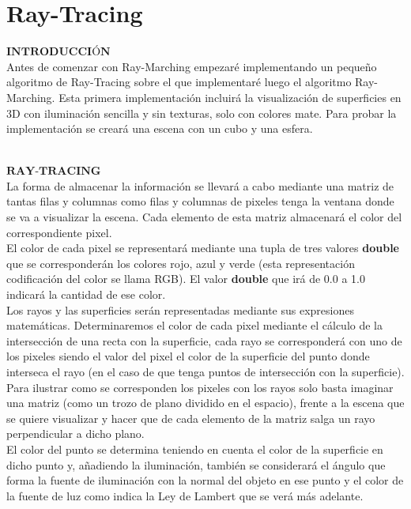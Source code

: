 \chapter*{Ray-Tracing}

$\textbf{INTRODUCCIÓN}$
${ }$\\

Antes de comenzar con Ray-Marching empezaré implementando un pequeño algoritmo de Ray-Tracing sobre el que implementaré luego el algoritmo Ray-Marching. Esta primera implementación incluirá la visualización de superficies en 3D con iluminación sencilla y sin texturas, solo con colores mate. Para probar la implementación se creará una escena con un cubo y una esfera.

${ }$\\
$\textbf{RAY-TRACING}$
${ }$\\

La forma de almacenar la información se llevará a cabo mediante una matriz de tantas filas y columnas como filas y columnas de pixeles tenga la ventana donde se va a visualizar la escena. Cada elemento de esta matriz almacenará el color del correspondiente pixel.
	${ }$\\	
	
El color de cada pixel se representará mediante una tupla de tres valores \textbf{double} que se corresponderán los colores rojo, azul y verde (esta representación codificación del color se llama RGB). El valor \textbf{double} que irá de 0.0 a 1.0 indicará la cantidad de ese color.
	${ }$\\	
	
Los rayos y las superficies serán representadas mediante sus expresiones matemáticas. Determinaremos el color de cada pixel mediante el cálculo de la intersección de una recta con la superficie, cada rayo se corresponderá con uno de los pixeles siendo el valor del pixel el color de la superficie del punto donde interseca el rayo (en el caso de que tenga puntos de intersección con la superficie). Para ilustrar como se corresponden los pixeles con los rayos solo basta imaginar una matriz (como un trozo de plano dividido en el espacio), frente a la escena que se quiere visualizar y hacer que de cada elemento de la matriz salga un rayo perpendicular a dicho plano.
	${ }$\\	
	
El color del punto se determina teniendo en cuenta el color de la superficie en dicho punto y, añadiendo la iluminación, también se considerará el ángulo que forma la fuente de iluminación con la normal del objeto en ese punto y el color de la fuente de luz como indica la Ley de Lambert que se verá más adelante.
	${ }$\\	

